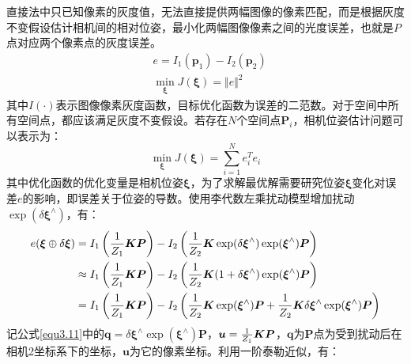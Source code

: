 直接法中只已知像素的灰度值，无法直接提供两幅图像的像素匹配，而是根据灰度不变假设估计相机间的相对位姿，最小化两幅图像像素之间的光度误差，也就是$P$点对应两个像素点的灰度误差。
\begin{equation}
\label{equ3.9}
\begin{aligned}
& e = I_1(\boldsymbol{p}_1) - I_2(\boldsymbol{p}_2) 
\\ 
& \min\limits_{\boldsymbol{\xi}} J(\boldsymbol{\xi}) = \Vert e \Vert ^2
\end{aligned}
\end{equation}
其中$I(\cdot)$表示图像像素灰度函数，目标优化函数为误差的二范数。对于空间中所有空间点，都应该满足灰度不变假设。若存在$N$个空间点$\boldsymbol{P}_i$，相机位姿估计问题可以表示为：
\begin{equation}
\label{equ3.10}
\min\limits_{\boldsymbol{\xi}} J(\boldsymbol{\xi}) = \sum\limits_{i=1}^N e_i^T e_i
\end{equation}
其中优化函数的优化变量是相机位姿$\boldsymbol{\xi}$，为了求解最优解需要研究位姿$\boldsymbol{\xi}$变化对误差$e$的影响，即误差关于位姿的导数。使用李代数左乘扰动模型增加扰动$\exp( \delta \boldsymbol{\xi}^{\wedge})$，有：
\begin{equation}
\label{equ3.11}
\begin{aligned}
e(\boldsymbol{\xi}\oplus \delta \boldsymbol{\xi}) & = I_1\left({1 \over Z_1} \boldsymbol{K} \boldsymbol{P} \right) - I_2\left({1 \over Z_2} \boldsymbol{K} \exp (\delta \boldsymbol{\xi}^{\wedge}) \exp (\boldsymbol{\xi}^{\wedge}) \boldsymbol{P} \right)
\\
& \approx I_1\left( {1 \over Z_1} \boldsymbol{K} \boldsymbol{P} \right) - I_2 \left( {1 \over Z_2} \boldsymbol{K} (1+\delta \boldsymbol{\xi}^{\wedge}) \exp (\boldsymbol{\xi}^{\wedge}) \boldsymbol{P} \right)
\\
& = I_1\left( {1 \over Z_1} \boldsymbol{K} \boldsymbol{P} \right) - I_2 \left({1 \over Z_2} \boldsymbol{K} \exp (\boldsymbol{\xi}^{\wedge}) \boldsymbol{P}+ {1 \over Z_2} \boldsymbol{K} \delta \boldsymbol{\xi}^{\wedge} \exp (\boldsymbol{\xi}^{\wedge}) \boldsymbol{P} \right)
\end{aligned}
\end{equation}
记公式\eqref{equ3.11}中的$\boldsymbol{q} = \delta \boldsymbol{\xi}^{\wedge} \exp (\boldsymbol{\xi}^{\wedge}) \boldsymbol{P} $，$\boldsymbol{u}={1 \over Z_1} \boldsymbol{K} \boldsymbol{P}$，$\boldsymbol{q}$为$\boldsymbol{P}$点为受到扰动后在相机2坐标系下的坐标，$\boldsymbol{u}$为它的像素坐标。利用一阶泰勒近似，有：
